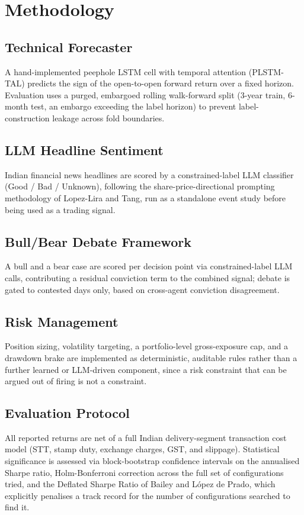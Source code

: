 \documentclass[10pt,conference]{IEEEtran}
\begin{document}
\section{Methodology}

\subsection{Technical Forecaster}
A hand-implemented peephole LSTM cell with temporal attention (PLSTM-TAL)
predicts the sign of the open-to-open forward return over a fixed horizon.
Evaluation uses a purged, embargoed rolling walk-forward split (3-year train,
6-month test, an embargo exceeding the label horizon) to prevent
label-construction leakage across fold boundaries.

\subsection{LLM Headline Sentiment}
Indian financial news headlines are scored by a constrained-label LLM
classifier (Good / Bad / Unknown), following the share-price-directional
prompting methodology of Lopez-Lira and Tang, run as a standalone event study
before being used as a trading signal.

\subsection{Bull/Bear Debate Framework}
A bull and a bear case are scored per decision point via constrained-label
LLM calls, contributing a residual conviction term to the combined signal;
debate is gated to contested days only, based on cross-agent conviction
disagreement.

\subsection{Risk Management}
Position sizing, volatility targeting, a portfolio-level gross-exposure cap,
and a drawdown brake are implemented as deterministic, auditable rules rather
than a further learned or LLM-driven component, since a risk constraint that
can be argued out of firing is not a constraint.

\subsection{Evaluation Protocol}
All reported returns are net of a full Indian delivery-segment transaction
cost model (STT, stamp duty, exchange charges, GST, and slippage). Statistical
significance is assessed via block-bootstrap confidence intervals on the
annualised Sharpe ratio, Holm-Bonferroni correction across the full set of
configurations tried, and the Deflated Sharpe Ratio of Bailey and L\'opez de
Prado, which explicitly penalises a track record for the number of
configurations searched to find it.
\end{document}
